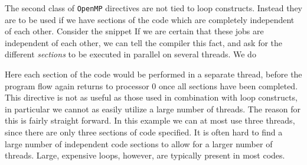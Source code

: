 \documentclass[twoside, 11pt, a4paper]{article}
\begin{document}
The second class of \texttt{OpenMP} directives are not tied to loop constructs. Instead they are to
be used if we have sections of the code which are completely independent of each other. Consider
the snippet 
If we are certain that these jobs are independent of each other, we can tell the compiler
this fact, and ask for the different \emph{sections} to be executed in parallel on
several threads. We do

Here each section of the code would be performed in a separate thread, before
the program flow again returns to processor 0 once all sections have been completed.
This directive is not as useful as those used in combination with loop constructs, in
particular we cannot as easily utilize a large number of threads. The reason for this
is fairly straight forward. In this example we can at most use three threads, since there
are only three sections of code specified. It is often hard to find a large number
of independent code sections to allow for a larger number of threads. Large, expensive loops,
however, are typically present in most codes.

%
%
\end{document}
